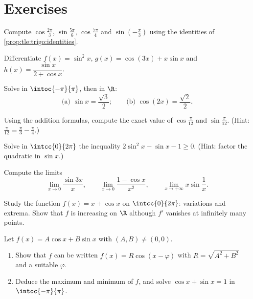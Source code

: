 \section{Exercises}

\begin{exercise}[$\star$]\label{exo:tle:trigo:1}
Compute $\cos\frac{2\pi}{3}$, $\sin\frac{5\pi}{6}$, $\cos\frac{7\pi}{4}$ and
$\sin\left(-\frac{\pi}{3}\right)$ using the identities of
\cref{prop:tle:trigo:identities}.
\end{exercise}

\begin{exercise}[$\star$]\label{exo:tle:trigo:2}
Differentiate $f(x) = \sin^2 x$, $g(x) = \cos(3x) + x\sin x$ and
$h(x) = \dfrac{\sin x}{2 + \cos x}$.
\end{exercise}

\begin{exercise}[$\star$]\label{exo:tle:trigo:3}
Solve in $\intoc{-\pi}{\pi}$, then in $\R$:
\[
\text{(a) } \sin x = \frac{\sqrt3}{2};
\qquad
\text{(b) } \cos\left(2x\right) = \frac{\sqrt2}{2} .
\]
\end{exercise}

\begin{exercise}[$\star\star$]\label{exo:tle:trigo:4}
Using the addition formulas, compute the exact value of
$\cos\frac{\pi}{12}$ and $\sin\frac{\pi}{12}$.
(Hint: $\frac{\pi}{12} = \frac{\pi}{3} - \frac{\pi}{4}$.)
\end{exercise}

\begin{exercise}[$\star\star$]\label{exo:tle:trigo:5}
Solve in $\intcc{0}{2\pi}$ the inequality $2\sin^2 x - \sin x - 1 \geq 0$.
(Hint: factor the quadratic in $\sin x$.)
\end{exercise}

\begin{exercise}[$\star\star$]\label{exo:tle:trigo:6}
Compute the limits
\[
\lim_{x\to0} \frac{\sin 3x}{x}, \qquad
\lim_{x\to0} \frac{1 - \cos x}{x^2}, \qquad
\lim_{x\to+\infty} x \sin\frac{1}{x}.
\]
\end{exercise}

\begin{exercise}[$\star\star$]\label{exo:tle:trigo:7}
Study the function $f(x) = x + \cos x$ on $\intcc{0}{2\pi}$: variations and
extrema. Show that $f$ is increasing on $\R$ although $f'$ vanishes at
infinitely many points.
\end{exercise}

\begin{exercise}[$\star\star\star$]\label{exo:tle:trigo:8}
Let $f(x) = A\cos x + B \sin x$ with $(A,B) \neq (0,0)$.
\begin{enumerate}
  \item Show that $f$ can be written $f(x) = R\cos(x - \varphi)$ with
        $R = \sqrt{A^2 + B^2}$ and a suitable $\varphi$.
  \item Deduce the maximum and minimum of $f$, and solve
        $\cos x + \sin x = 1$ in $\intoc{-\pi}{\pi}$.
\end{enumerate}
\end{exercise}

